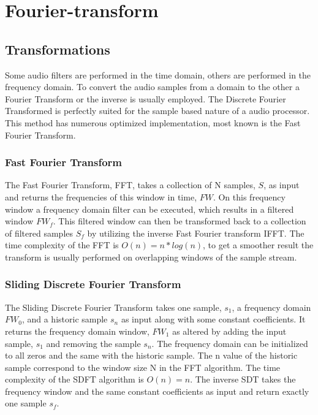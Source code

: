 \chapter{Fourier-transform}
\section{Transformations}
Some audio filters are performed in the time domain, others are performed in the
frequency domain.  To convert the audio samples from a domain
to the other a Fourier Transform or the inverse is usually employed. The
Discrete Fourier Transformed  is perfectly suited for the sample based
nature of a audio processor. This method has numerous optimized implementation,
most known is the Fast Fourier Transform.

\subsection{Fast Fourier Transform}
The Fast Fourier Transform, FFT, takes a collection of N samples, $S$, as input
and returns the frequencies of this window in time, $FW$. On this frequency
window a frequency domain filter can be executed, which results in a filtered
window $FW_f$. This filtered window can then be transformed back to a collection
of filtered samples $S_f$ by utilizing the inverse Fast Fourier transform IFFT.
The time complexity of the FFT is $O(n) = n*log(n)$, to get a smoother result
the transform is usually performed on overlapping windows of the sample stream.

\subsection{Sliding Discrete Fourier Transform}
The Sliding Discrete Fourier Transform takes one sample, $s_1$, a
frequency domain $FW_0$, and a historic sample $s_n$ as input along with some
constant coefficients.
It returns the frequency domain window, $FW_1$ as altered by adding the input
sample, $s_1$ and removing the sample $s_n$. The frequency domain can be
initialized to all zeros and the same with the historic sample. The n value of
the historic sample correspond to the window size N in the FFT algorithm. The
time complexity of the SDFT algorithm is $O(n) = n$. The inverse SDT takes the
frequency window and the same constant coefficients as input and return exactly
one sample $s_f$.

